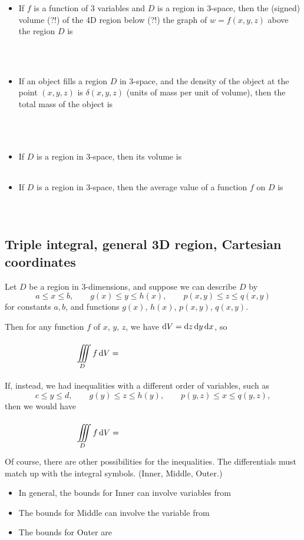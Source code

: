 \begin{itemize}
    \item 
    If $f$ is a function of 3 variables and $D$ is a region in 3-space, then the (signed) volume (?!) of the 4D region below (?!) the graph of $w=f(x,y,z)$ above the region $D$ is
    \[
        \phantom{\iiint\limits_D f\dV.}
    \]
    
    \item If an object fills a region $D$ in 3-space, and the density of the object at the point $(x,y,z)$ is $\delta(x,y,z)$ (units of mass per unit of volume), then the total mass of the object is %
    \[
        \phantom{\iiint\limits_D \delta \dV.}
    \]
    
    \item If $D$ is a region in 3-space, then its volume is 
    $\phantom{\displaystyle\iiint \limits_D \dV.}$
    
    \item If $D$ is a region in 3-space, then the average value of a function $f$ on $D$ is 
    $\phantom{\displaystyle\dfrac{1}{\text{vol}(D)}\iiint\limits_D f\dV.}$
\end{itemize}

\pagebreak 



\pagebreak 

\subsection{Triple integral, general 3D region, Cartesian coordinates}
Let $D$ be a region in 3-dimensions, and suppose we can describe $D$ by 
\[ 
    a\le x\le b, \quad\quad
    g(x)\le y\le h(x), \quad\quad
    p(x,y) \le z \le q(x,y) 
\]
for constants $a, b$, and functions $g(x)$, $h(x)$, $p(x,y)$, $q(x,y)$.

Then for any function $f$ of $x$, $y$, $z$, we have $\mathop{}\!\mathrm{d} V=\mathop{}\!\mathrm{d} z\mathop{}\!\mathrm{d} y\mathop{}\!\mathrm{d} x$, so 
\[
    \iiint\limits_D f\dV = 
    \phantom{\int\limits_a^b \int\limits_{g(x)}^{h(x)} \int\limits_{p(x,y)}^{q(x,y)} f(x,y,z)\dz\dy\dx.}
\]

If, instead, we had inequalities with a different order of variables, such as
\[ 
    c\le y\le d, \quad\quad
    g(y)\le z\le h(y), \quad\quad
    p(y,z) \le x \le q(y,z), 
\]
then we would have 
\[
    \iiint\limits_D f\dV = 
    \phantom{\int\limits_c^d \int\limits_{g(y)}^{h(y)} \int\limits_{p(y,z)}^{q(y,z)} f(x,y,z)\dx\dz\dy.}
\]
Of course, there are other possibilities for the inequalities. The differentials must match up with the integral symbols. (Inner, Middle, Outer.) 
\begin{itemize} 
    \item In general, the bounds for Inner can involve variables from %
    \\ 
    \item The bounds for Middle can involve the variable from %
    \\ 
    \item The bounds for Outer are %
    \\
\end{itemize} 

